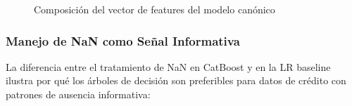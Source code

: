 \documentclass[
  spanish,
  11pt,
  letterpaper,
]{scrbook}
\newcounter{none} %
\theoremstyle{plain}
\theoremstyle{remark}
\begin{document}
\begin{figure}


\caption{\label{fig-feature-composition}Composición del vector de
features del modelo canónico}

\end{figure}%

\subsubsection{Manejo de NaN como Señal
Informativa}\label{manejo-de-nan-como-seuxf1al-informativa}

La diferencia entre el tratamiento de NaN en CatBoost y en la LR
baseline ilustra por qué los árboles de decisión son preferibles para
datos de crédito con patrones de ausencia informativa:
\end{document}
